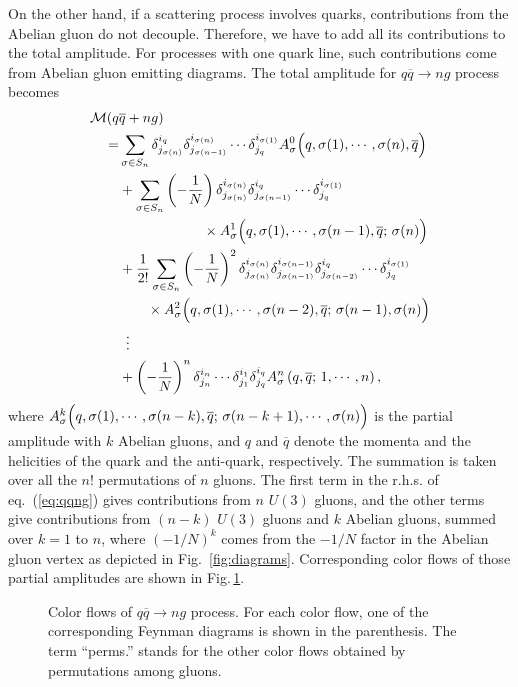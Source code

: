 On the other hand, if a scattering process involves quarks, contributions
from the Abelian gluon do not decouple. Therefore, we have to add all
its contributions to the total amplitude. For
processes with one quark line, such contributions come from Abelian gluon
emitting diagrams. The total
amplitude for $q\overline{q}\rightarrow ng$ process becomes
\begin{align}
{\cal M}(q&\overline{q}+ng)\nonumber\\
=&\sum_{\sigma\in S_n}\delta^{i_q}_{j_{\sigma(n)}}
\delta^{i_{\sigma(n)}}_{j_{\sigma(n-1)}}\cdots\delta^{i_{\sigma(1)}}_{j_q} A^0_{\sigma}\Bigl(q,\sigma(1),\cdots,\sigma(n),\overline{q}\Bigr)\nonumber\\
&+\sum_{\sigma\in S_n}\left(-\frac{1}{N}\right)\delta^{i_{\sigma(n)}}_{j_{\sigma(n)}}\delta^{i_q}_{j_{\sigma(n-1)}}
\cdots\delta^{i_{\sigma(1)}}_{j_q}\nonumber\\
&\hspace{6em}\times A^1_{\sigma}\Bigl(q,\sigma(1),\cdots,\sigma(n-1),\overline{q};\,\sigma(n)\Bigr)\nonumber\\
&+\frac{1}{2!}\sum_{\sigma\in
 S_n}\left(-\frac{1}{N}\right)^2\delta^{i_{\sigma(n)}}_{j_{\sigma(n)}}\delta^{i_{\sigma(n-1)}}_{j_{\sigma(n-1)}}
 \delta^{i_q}_{j_{\sigma(n-2)}}\cdots\delta^{i_{\sigma(1)}}_{j_q}\nonumber\\ 
&\hspace{2em}\times A^2_{\sigma}\Bigl(q,\sigma(1),\cdots,\sigma(n-2),\overline{q};\,\sigma(n-1),\sigma(n)\Bigr)\nonumber\\
&\hspace{0.5em}\vdots\nonumber\\
&+\left(-\frac{1}{N}\right)^n\delta^{i_n}_{j_n}\cdots\delta^{i_1}_{j_1}\delta^{i_q}_{j_q}
A^n_{\sigma}\left(q,\overline{q};\,1,\cdots,n\right),
\label{eq:qqng}
\end{align}
where
$A^k_{\sigma}\Bigl(q,\sigma(1),\cdots,\sigma(n-k),\overline{q};\,\sigma(n-k+1),\cdots,\sigma(n)\Bigr)$
is the partial amplitude with $k$ Abelian gluons, and $q$ and
$\overline{q}$ denote the momenta and the helicities of the quark and the anti-quark,
respectively. The summation is taken over all the $n!$ permutations of $n$ gluons. The
first term in the r.h.s. of eq.~(\ref{eq:qqng}) gives contributions from
$n$ $U(3)$ gluons, and the other terms give contributions from
$(n-k)$ $U(3)$ gluons and $k$ Abelian gluons, summed over $k=1$ to
$n$, where $(-1/N)^k$ comes from the $-1/N$ factor in the Abelian gluon vertex as depicted in Fig.~\ref{fig:diagrams}. Corresponding color flows of those partial amplitudes are shown in Fig.\,\ref{fig:qqbarcf}.
\begin{figure}
\caption{Color flows of $q\overline{q}\rightarrow ng$ process. For each
 color flow, one of the corresponding Feynman diagrams is shown in the parenthesis. The
 term ``perms.'' stands for the other color flows obtained by permutations among gluons.}
\label{fig:qqbarcf}
\end{figure}


